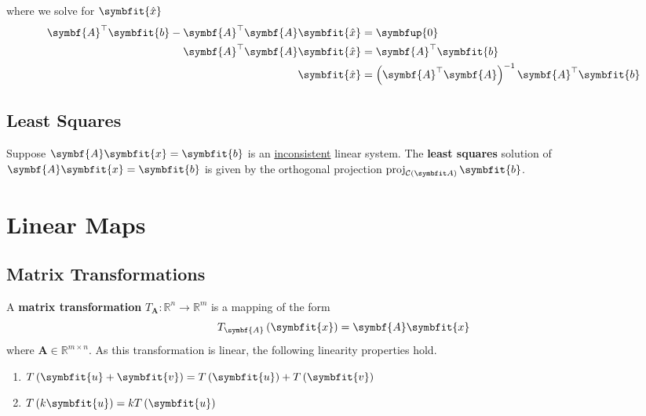 \documentclass{article}
\begin{document}
\begin{solution}[Proof]
\begin{equation*}
    \end{equation*}
    where we solve for \(\symbfit{\hat{x}}\)
    \begin{align*}
        \symbf{A}^\top \symbfit{b}-\symbf{A}^\top \symbf{A}\symbfit{\hat{x}} & = \symbfup{0}                                                                  \\
        \symbf{A}^\top \symbf{A}\symbfit{\hat{x}}                              & = \symbf{A}^\top \symbfit{b}                                                 \\
        \symbfit{\hat{x}}                                                          & = \left( \symbf{A}^\top \symbf{A} \right)^{-1}\symbf{A}^\top \symbfit{b}
    \end{align*}
\end{solution}
\subsection{Least Squares}
\begin{theorem}
    Suppose \(\symbf{A}\symbfit{x}=\symbfit{b}\) is an
    \underline{inconsistent} linear system. The \textbf{least squares}
    solution of \(\symbf{A}\symbfit{x}=\symbfit{b}\) is given by the
    orthogonal projection \(\proj_{\columnspace{A}}\symbfit{b}\).
\end{theorem}
\newpage
\section{Linear Maps}
\subsection{Matrix Transformations}
\begin{definition}
    A \textbf{matrix transformation}
    \(T_{\symbf{A}}:\mathbb{R}^n\rightarrow \mathbb{R}^m\) is a
    mapping of the form
    \begin{equation*}
        T_{\symbf{A}}\left(\symbfit{x}\right) = \symbf{A}\symbfit{x}
    \end{equation*}
    where \(\symbf{A}\in \mathbb{R}^{m \times n}\). As this
    transformation is linear, the following linearity properties hold.
    \begin{enumerate}
        \item \(T\left(\symbfit{u}+\symbfit{v}\right)=T\left(\symbfit{u}\right) + T\left(\symbfit{v}\right)\)
        \item \(T\left(k\symbfit{u}\right)= kT\left(\symbfit{u}\right)\)
    \end{enumerate}
\end{definition}
\end{document}
